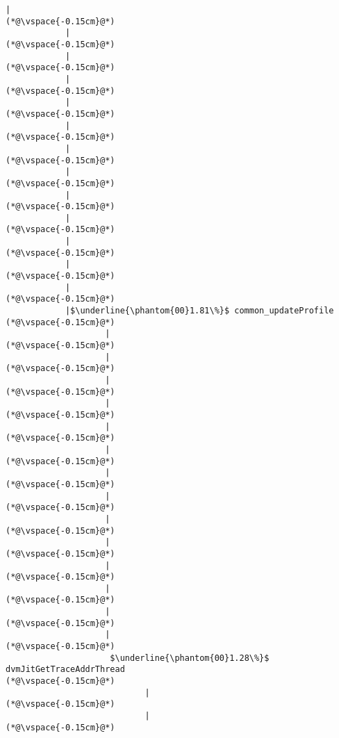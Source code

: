 \begin{lstlisting}[caption=Staattinen metodi Java$\to$C , label=profile:J2CBenchmark00001, numberbychapter=true, frame=lines, float, floatplacement=t]
            |
(*@\vspace{-0.15cm}@*)
            |
(*@\vspace{-0.15cm}@*)
            |
(*@\vspace{-0.15cm}@*)
            |
(*@\vspace{-0.15cm}@*)
            |
(*@\vspace{-0.15cm}@*)
            |
(*@\vspace{-0.15cm}@*)
            |
(*@\vspace{-0.15cm}@*)
            |
(*@\vspace{-0.15cm}@*)
            |
(*@\vspace{-0.15cm}@*)
            |
(*@\vspace{-0.15cm}@*)
            |
(*@\vspace{-0.15cm}@*)
            |
(*@\vspace{-0.15cm}@*)
            |
(*@\vspace{-0.15cm}@*)
            |$\underline{\phantom{00}1.81\%}$ common_updateProfile
(*@\vspace{-0.15cm}@*)
                    |
(*@\vspace{-0.15cm}@*)
                    |
(*@\vspace{-0.15cm}@*)
                    |
(*@\vspace{-0.15cm}@*)
                    |
(*@\vspace{-0.15cm}@*)
                    |
(*@\vspace{-0.15cm}@*)
                    |
(*@\vspace{-0.15cm}@*)
                    |
(*@\vspace{-0.15cm}@*)
                    |
(*@\vspace{-0.15cm}@*)
                    |
(*@\vspace{-0.15cm}@*)
                    |
(*@\vspace{-0.15cm}@*)
                    |
(*@\vspace{-0.15cm}@*)
                    |
(*@\vspace{-0.15cm}@*)
                    |
(*@\vspace{-0.15cm}@*)
                    |
(*@\vspace{-0.15cm}@*)
                     $\underline{\phantom{00}1.28\%}$ dvmJitGetTraceAddrThread
(*@\vspace{-0.15cm}@*)
                            |
(*@\vspace{-0.15cm}@*)
                            |
(*@\vspace{-0.15cm}@*)

\end{lstlisting}
